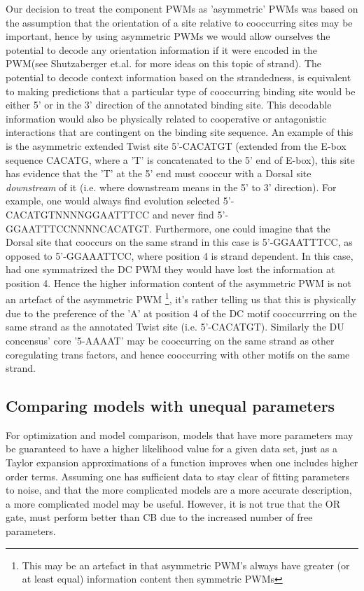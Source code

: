 Our decision to treat the component PWMs as 'asymmetric' PWMs was based on the assumption that the orientation of a site relative to cooccurring sites may be important, hence by using asymmetric PWMs we would allow ourselves the potential to decode any orientation information if it were encoded in the PWM(see Shutzaberger et.al. for more ideas on this topic of strand\cite{Shutzabergerpmid18030333}).  The potential to decode context information based on the strandedness, is equivalent to making predictions that a particular type of cooccurring binding site would be either 5' or in the 3' direction of the annotated binding site.  This decodable information would also be physically related to cooperative or antagonistic interactions that are contingent on the binding site sequence.  An example of this is the asymmetric extended Twist site 5'-CACATGT (extended from the E-box sequence CACATG, where a 'T' is concatenated to the 5' end of E-box), this site has evidence that the 'T' at the 5' end must cooccur with a Dorsal site \textit{downstream} of it (i.e. where downstream means in the 5' to 3' direction)\cite{pmid16750631}.  For example, one would always find evolution selected 5'-CACATGTNNNNGGAATTTCC and never find 5'-GGAATTTCCNNNNCACATGT.  Furthermore, one could imagine that the Dorsal site that cooccurs on the same strand in this case is 5'-GGAATTTCC, as opposed to 5'-GGAAATTCC, where position 4 is strand dependent.  In this case, had one symmatrized the DC PWM they would have lost the information at position 4.  Hence the higher information content of the asymmetric PWM is not an artefact of the asymmetric PWM \footnote{This may be an artefact in that asymmetric PWM's always have greater (or at least equal) information content then symmetric PWMs}, it's rather telling us that this is physically due to the preference of the 'A' at position 4 of the DC motif cooccurrring on the same strand as the annotated Twist site (i.e. 5'-CACATGT).  Similarly the DU concensus' core '5-AAAAT' may be cooccurring on the same strand as other coregulating trans factors, and hence cooccurring with other motifs on the same strand.       
	
\subsection{Comparing models with unequal parameters}
 For optimization and model comparison, models that have more parameters may be guaranteed to have a higher likelihood value for a given data set, just as a Taylor expansion approximations of a function improves when one includes higher order terms.  Assuming one has sufficient data to stay clear of fitting parameters to noise, and that the more complicated models are a more accurate description, a more complicated model may be useful.  However, it is not true that the OR gate, must perform better than CB due to the increased number of free parameters.  
 
